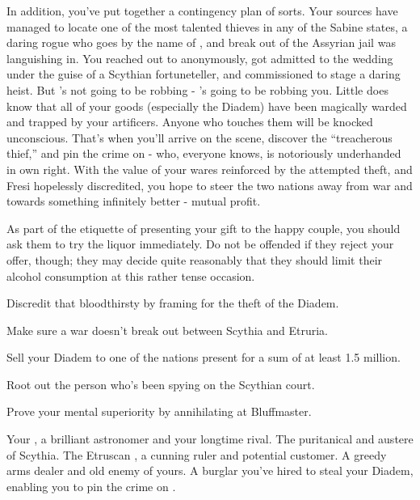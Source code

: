 \documentclass[char]{Kos}
\begin{document}
In addition, you've put together a contingency plan of sorts. Your sources have managed to locate one of the most talented thieves in any of the Sabine states, a daring rogue who goes by the name of \cBurglar{}, and break \cBurglar{\them} out of the Assyrian jail \cBurglar{\they} was languishing in. You reached out to \cBurglar{\them} anonymously, got \cBurglar{\them} admitted to the wedding under the guise of a Scythian fortuneteller, and commissioned \cBurglar{\them} to stage a daring heist. But \cBurglar{\they}'s not going to be robbing \cArmsDealer{} - \cBurglar{\they}'s going to be robbing you. Little does \cBurglar{\they} know that all of your goods (especially the Diadem) have been magically warded and trapped by your artificers. Anyone who touches them will be knocked unconscious. That's when you'll arrive on the scene, discover the ``treacherous thief,'' and pin the crime on \cArmsDealer{} - who, everyone knows, is notoriously underhanded in \cArmsDealer{\their} own right. With the value of your wares reinforced by the attempted theft, and Fresi hopelessly discredited, you hope to steer the two nations away from war and towards something infinitely better - mutual profit.

\begin{itemz}[Notes]
  \item As part of the etiquette of presenting your gift to the happy couple, you should ask them to try the liquor immediately. Do not be offended if they reject your offer, though; they may decide quite reasonably that they should limit their alcohol consumption at this rather tense occasion.
\end{itemz}


\begin{itemz}[Goals]
\item Discredit that bloodthirsty \cArmsDealer{\InsultThree} \cArmsDealer{} by framing \cArmsDealer{\them} for the theft of the Diadem.
\item Make sure a war doesn't break out between Scythia and Etruria.
\item Sell your Diadem to one of the nations present for a sum of at least 1.5 million.
\item Root out the person who's been spying on the Scythian court.
\item Prove your mental superiority by annihilating \cArmsDealer{} at Bluffmaster.
\end{itemz}

\begin{contacts}
\contact{\cAnarchist{}} Your \cAnarchist{\sibling}, a brilliant astronomer and your longtime rival.
\contact{\cScythiaQueen{}} The puritanical and austere \cScythiaQueen{\monarch} of Scythia.
\contact{\cEtruriaKing{}} The Etruscan \cEtruriaKing{\monarch}, a cunning ruler and potential customer.
\contact{\cArmsDealer{}} A greedy arms dealer and old enemy of yours.
\contact{\cBurglar{}} A burglar you've hired to steal your Diadem, enabling you to pin the crime on \cArmsDealer{}.
\end{contacts}
\end{document}
